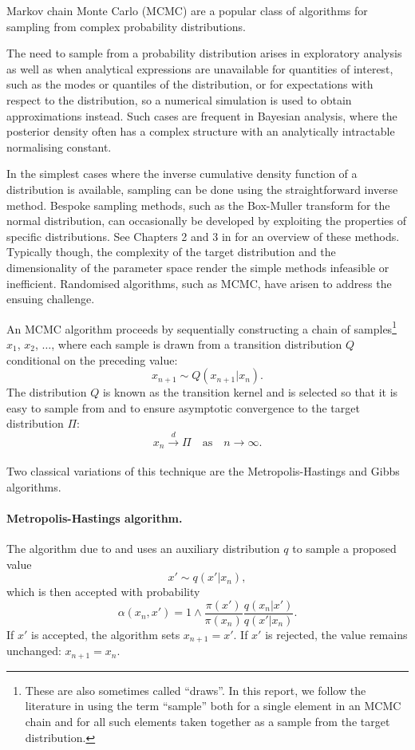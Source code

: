 \documentclass[11pt,a4paper]{report}
\begin{document}
Markov chain Monte Carlo (MCMC) are a popular class of algorithms for sampling from complex probability distributions.

The need to sample from a probability distribution arises in exploratory analysis as well as when analytical expressions are unavailable for quantities of interest, such as the modes or quantiles of the distribution, or for expectations with respect to the distribution, so a numerical simulation is used to obtain approximations instead. Such cases are frequent in Bayesian analysis, where the posterior density often has a complex structure with an analytically intractable normalising constant.

In the simplest cases where the inverse cumulative density function of a distribution is available, sampling can be done using the straightforward inverse method. Bespoke sampling methods, such as the Box-Muller transform for the normal distribution, can occasionally be developed by exploiting the properties of specific distributions. See Chapters 2 and 3 in \cite{robertMonteCarloStatistical2004} for an overview of these methods. Typically though, the complexity of the target distribution and the dimensionality of the parameter space render the simple methods infeasible or inefficient. Randomised algorithms, such as MCMC, have arisen to address the ensuing challenge.


An MCMC algorithm proceeds by sequentially constructing a chain of samples\footnote{These are also sometimes called ``draws''. In this report, we follow the literature in using the term ``sample'' both for a single element in an MCMC chain and for all such elements taken together as a sample from the target distribution.} $x_1$, $x_2$, $\dots$,  where each sample is drawn from a transition distribution $Q$ conditional on the preceding value:
$$x_{n+1} \sim Q(x_{n+1}|x_n).$$
The distribution $Q$ is known as the transition kernel and is selected so that it is easy to sample from and to ensure asymptotic convergence to the target distribution $\Pi$:
$$x_n \xrightarrow[]{d} \Pi \quad\text{as}\quad n \to \infty.$$

Two classical variations of this technique are the Metropolis-Hastings and Gibbs algorithms.

\paragraph{Metropolis-Hastings algorithm.} The algorithm due to \cite{metropolisEquationStateCalculations1953} and \cite{hastingsMonteCarloSampling1970} uses an auxiliary distribution $q$ to sample a proposed value
$$x' \sim q(x' | x_n),$$
which is then accepted with probability
$$\alpha(x_n, x') = 1 \wedge \frac{\pi(x')}{\pi(x_n)} \frac{q(x_n|x')}{q(x'|x_n)}.$$
If $x'$ is accepted, the algorithm sets $x_{n+1} = x'$. If $x'$ is rejected, the value remains unchanged: $x_{n+1} = x_n$.
\end{document}
